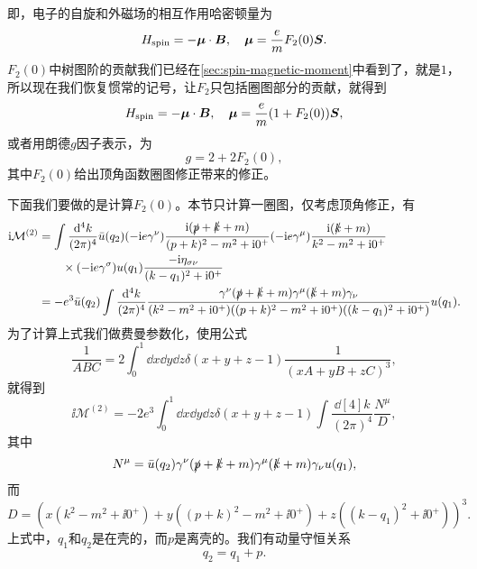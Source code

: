 即，电子的自旋和外磁场的相互作用哈密顿量为
\begin{equation}
    H_\text{spin} = - \vb*{\mu} \cdot \vb*{B}, \quad \vb*{\mu} = \frac{e}{m} F_2(0) \vb*{S}.
\end{equation}
$F_2(0)$中树图阶的贡献我们已经在\autoref{sec:spin-magnetic-moment}中看到了，就是$1$，所以现在我们恢复惯常的记号，让$F_2$只包括圈图部分的贡献，就得到
\begin{equation}
    H_\text{spin} = - \vb*{\mu} \cdot \vb*{B}, \quad \vb*{\mu} = \frac{e}{m} (1 + F_2(0)) \vb*{S},
\end{equation}
或者用朗德$g$因子表示，为
\begin{equation}
    g = 2 + 2 F_2(0),
\end{equation}
其中$F_2(0)$给出顶角函数圈图修正带来的修正。

下面我们要做的是计算$F_2(0)$。本节只计算一圈图，仅考虑顶角修正，有
\begin{equation}
    \begin{aligned}
        \mathrm{i} \mathcal{M}^{(2)} &= \int \frac{\dd[4]{k}}{(2\pi)^4} \bar{u}(q_2) (-\mathrm{i} e \gamma^\nu) \frac{\mathrm{i} (\slashed{p} + \slashed{k} + m)}{(p + k)^2 - m^2 + \mathrm{i} 0^+} (- \mathrm{i} e \gamma^\mu) \frac{\mathrm{i} (\slashed{k} + m)}{k^2 - m^2 + \mathrm{i} 0^+} \\
        &\quad \quad \times (-\mathrm{i} e \gamma^\sigma) u(q_1) \frac{-\mathrm{i} \eta_{\sigma \nu}}{(k - q_1)^2 + \mathrm{i} 0^+} \\
        &= - e^3 \bar{u}(q_2) \int \frac{\dd[4]{k}}{(2\pi)^4} \frac{\gamma^\nu (\slashed{p} + \slashed{k} + m) \gamma^\mu (\slashed{k} + m) \gamma_\nu}{(k^2 - m^2 + \mathrm{i} 0^+) ((p + k)^2 - m^2 + \mathrm{i} 0^+) ((k - q_1)^2 + \mathrm{i} 0^+)} u(q_1).
    \end{aligned}
\end{equation}
为了计算上式我们做费曼参数化，使用公式
\[
    \frac{1}{ABC} = 2 \int_0^1 \dd{x} \dd{y} \dd{z} \delta(x + y + z - 1) \frac{1}{(x A + y B + z C)^3},
\]
就得到
\begin{equation}
    \ii \mathcal{M}^{(2)} = - 2 e^3 \int_0^1 \dd{x} \dd{y} \dd{z} \delta(x + y + z - 1) \int \frac{\dd[4]{k}}{(2\pi)^4} \frac{N^\mu}{D},
    \label{eq:vertex-one-loop-integral}
\end{equation}
其中
\begin{equation}
    N^\mu = \bar{u}(q_2) \gamma^\nu (\slashed{p} + \slashed{k} + m) \gamma^\mu (\slashed{k} + m) \gamma_\nu u(q_1),
\end{equation}
而
\begin{equation}
    D = (x (k^2 - m^2 + \ii 0^+) + y ((p + k)^2 - m^2 + \ii 0^+) + z ((k - q_1)^2 + \ii 0^+))^3.
\end{equation}
上式中，$q_1$和$q_2$是在壳的，而$p$是离壳的。我们有动量守恒关系
\begin{equation}
    q_2 = q_1 + p.
\end{equation}

